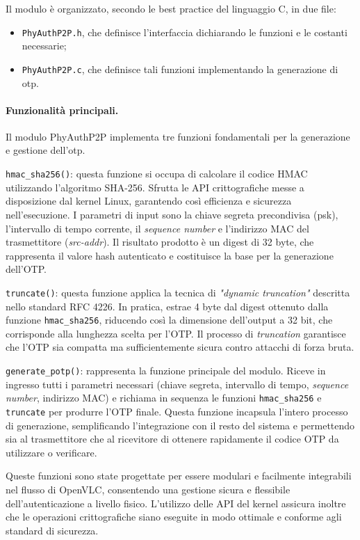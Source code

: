 \noindent Il modulo è organizzato, secondo le best practice del linguaggio C, in due file:
\begin{itemize}
    \item \texttt{PhyAuthP2P.h}, che definisce l'interfaccia dichiarando le funzioni e le costanti necessarie;
    \item \texttt{PhyAuthP2P.c}, che definisce tali funzioni implementando la generazione di \gls{otp}.
\end{itemize}

\paragraph{Funzionalità principali.}
Il modulo PhyAuthP2P implementa tre funzioni fondamentali per la generazione e gestione dell'\gls{otp}.

\texttt{hmac\_sha256()}: questa funzione si occupa di calcolare il codice HMAC utilizzando l'algoritmo SHA-256. Sfrutta le API crittografiche messe a disposizione dal kernel Linux, garantendo così efficienza e sicurezza nell'esecuzione. I parametri di input sono la chiave segreta precondivisa (\gls{psk}), l'intervallo di tempo corrente, il \textit{sequence number} e l'indirizzo MAC del trasmettitore (\textit{src-addr}). Il risultato prodotto è un digest di 32 byte, che rappresenta il valore hash autenticato e costituisce la base per la generazione dell'OTP.

\texttt{truncate()}: questa funzione applica la tecnica di \textit{"dynamic truncation"} descritta nello standard RFC 4226. In pratica, estrae 4 byte dal digest ottenuto dalla funzione \texttt{hmac\_sha256}, riducendo così la dimensione dell'output a 32 bit, che corrisponde alla lunghezza scelta per l'OTP. Il processo di \textit{truncation} garantisce che l'OTP sia compatta ma sufficientemente sicura contro attacchi di forza bruta.

\texttt{generate\_potp()}: rappresenta la funzione principale del modulo. Riceve in ingresso tutti i parametri necessari (chiave segreta, intervallo di tempo, \textit{sequence number}, indirizzo MAC) e richiama in sequenza le funzioni \texttt{hmac\_sha256} e \texttt{truncate} per produrre l'OTP finale. Questa funzione incapsula l'intero processo di generazione, semplificando l'integrazione con il resto del sistema e permettendo sia al trasmettitore che al ricevitore di ottenere rapidamente il codice OTP da utilizzare o verificare.

Queste funzioni sono state progettate per essere modulari e facilmente integrabili nel flusso di OpenVLC, consentendo una gestione sicura e flessibile dell'autenticazione a livello fisico. L'utilizzo delle API del kernel assicura inoltre che le operazioni crittografiche siano eseguite in modo ottimale e conforme agli standard di sicurezza.

